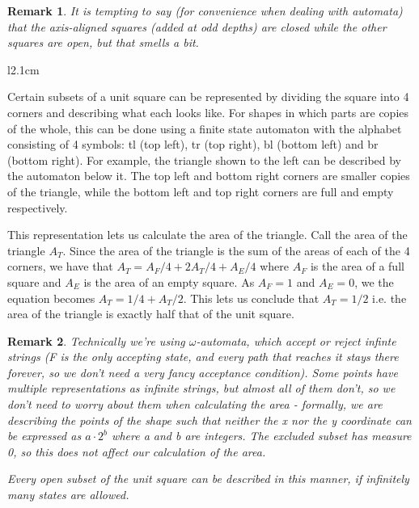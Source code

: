 \documentclass{article}
\newtheorem*{remark}{Remark}
\begin{document}
\begin{remark}
	It is tempting to say (for convenience when dealing with automata) that the axis-aligned squares (added at odd depths) are closed while the other squares are open, but that smells a bit.
\end{remark}



\begin{wrapfigure}{l}{2.1cm}
\end{wrapfigure}

Certain subsets of a unit square can be represented by dividing the square into 4 corners and describing what each looks like. For shapes in which parts are copies of the whole, this can be done using a finite state automaton with the alphabet consisting of 4 symbols: tl (top left), tr (top right), bl (bottom left) and br (bottom right). For example, the triangle shown to the left can be described by the automaton below it. The top left and bottom right corners are smaller copies of the triangle, while the bottom left and top right corners are full and empty respectively.

This representation lets us calculate the area of the triangle. Call the area of the triangle $A_T$. Since the area of the triangle is the sum of the areas of each of the 4 corners, we have that $A_T = A_F/4 + 2A_T/4 + A_E/4$ where $A_F$ is the area of a full square and $A_E$ is the area of an empty square. As $A_F=1$ and $A_E=0$, we the equation becomes $A_T = 1/4 + A_T/2$. This lets us conclude that $A_T = 1/2$ i.e. the area of the triangle is exactly half that of the unit square.

\begin{remark}
	Technically we're using $\omega$-automata, which accept or reject infinte strings (F is the only accepting state, and every path that reaches it stays there forever, so we don't need a very fancy acceptance condition).
	Some points have multiple representations as infinite strings, but almost all of them don't, so we don't need to worry about them when calculating the area - formally, we are describing the points of the shape such that neither the x nor the y coordinate can be expressed as $a \cdotp 2^b$ where a and b are integers. The excluded subset has measure 0, so this does not affect our calculation of the area.
	
	Every open subset of the unit square can be described in this manner, if infinitely many states are allowed.
\end{remark}
\end{document}
